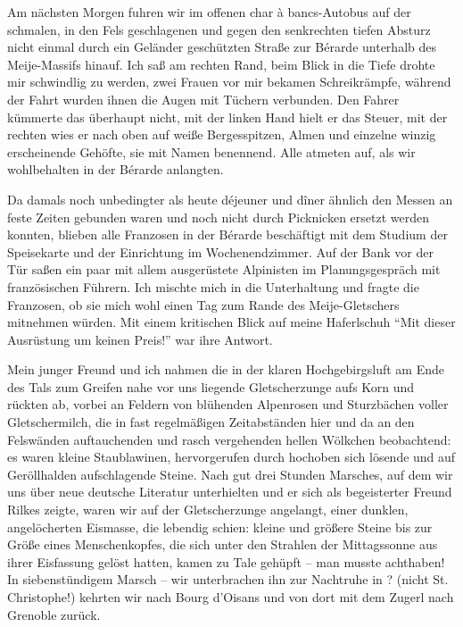 Am nächsten Morgen fuhren wir im offenen char à bancs-Autobus auf der schmalen, in den Fels geschlagenen und gegen den senkrechten tiefen Absturz nicht einmal durch ein Geländer geschützten Straße zur Bérarde unterhalb des Meije-Massifs hinauf. Ich saß am rechten Rand, beim Blick in die Tiefe drohte mir schwindlig zu werden, zwei Frauen vor mir bekamen Schreikrämpfe, während der Fahrt wurden ihnen die Augen mit Tüchern verbunden. Den Fahrer kümmerte das überhaupt nicht, mit der linken Hand hielt er das Steuer, mit der rechten wies er nach oben auf weiße Bergesspitzen, Almen und einzelne winzig erscheinende Gehöfte, sie mit Namen benennend. Alle atmeten auf, als wir wohlbehalten in der Bérarde anlangten.

Da damals noch unbedingter als heute déjeuner und dîner ähnlich den Messen an feste Zeiten gebunden waren und noch nicht durch Picknicken ersetzt werden konnten, blieben alle Franzosen in der Bérarde beschäftigt mit dem Studium der Speisekarte und der Einrichtung im Wochenendzimmer. Auf der Bank vor der Tür saßen ein paar mit allem ausgerüstete Alpinisten im Planungsgespräch mit französischen Führern. Ich mischte mich in die Unterhaltung und fragte die Franzosen, ob sie mich wohl einen Tag zum Rande des Meije-Gletschers mitnehmen würden. Mit einem kritischen Blick auf meine Haferlschuh \enquote{Mit dieser Ausrüstung um keinen Preis!} war ihre Antwort.

Mein junger Freund und ich nahmen die in der klaren Hochgebirgsluft am Ende des Tals zum Greifen nahe vor uns liegende Gletscherzunge aufs Korn und rückten ab, vorbei an Feldern von blühenden Alpenrosen und Sturzbächen voller Gletschermilch, die in fast regelmäßigen Zeitabständen hier und da an den Felswänden auftauchenden und rasch vergehenden hellen Wölkchen beobachtend: es waren kleine Staublawinen, hervorgerufen durch hochoben sich lösende und auf Geröllhalden aufschlagende Steine. Nach gut drei Stunden Marsches, auf dem wir uns über neue deutsche Literatur unterhielten und er sich als begeisterter Freund Rilkes zeigte, waren wir auf der Gletscherzunge angelangt, einer dunklen, angelöcherten Eismasse, die lebendig schien: kleine und größere Steine bis zur Größe eines Menschenkopfes, die sich unter den Strahlen der Mittagssonne aus ihrer Eisfassung gelöst hatten, kamen zu Tale gehüpft -- man musste achthaben! In siebenstündigem Marsch -- wir unterbrachen ihn zur Nachtruhe in ? (nicht St. Christophe!) kehrten wir nach Bourg d'Oisans und von dort mit dem Zugerl nach Grenoble zurück.

